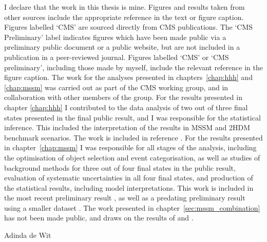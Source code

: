 \begin{declaration}
  I declare that the work in this thesis is mine. Figures and results taken from other sources
include the appropriate reference in the text or figure caption. Figures labelled `CMS' are sourced
directly from CMS publications. The `CMS Preliminary' label indicates figures which
have been made public via a preliminary public document or a public website, but are not
included in a publication in a peer-reviewed journal. Figures labelled `CMS' or `CMS preliminary', 
including those made by myself, include the relevant reference in the figure caption.
The work for the analyses presented in chapters~\ref{chap:hhh} and \ref{chap:mssm} was 
carried out as part of the CMS \Htotautau working group, and in collaboration with other members of the group.
For the results presented in chapter \ref{chap:hhh} I contributed to the data analysis of two out of three
final states presented in the final public result, and I 
was responsible for the statistical inference. This included
the interpretation of the results in MSSM and 2HDM benchmark scenarios. The 
work is included in reference \cite{CMS-HIG-14-034}. For the results presented in chapter~\ref{chap:mssm}
I was responsible for all stages of the analysis, including the optimisation
of object selection and event categorisation, as well as studies of background
methods for three out of four final states in the public result,
evaluation of systematic uncertainties in all four final states, and production of the statistical
results, including model interpretations. This work is included in the most recent
preliminary result \cite{CMS-PAS-HIG-16-037}, as well as a predating preliminary
result using a smaller dataset \cite{CMS-PAS-HIG-16-006}.
The work presented in chapter~\ref{sec:mssm_combination} has
not been made public, and draws on the results of \cite{CMS-PAS-HIG-16-037} and \cite{CMS-PAS-HIG-16-006}.

  \begin{flushright}
  Adinda de Wit
  \end{flushright}
\end{declaration}


